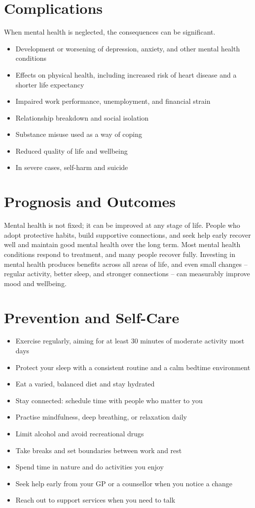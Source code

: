 \section*{Complications}
When mental health is neglected, the consequences can be significant.

\begin{itemize}
    \item Development or worsening of depression, anxiety, and other mental health conditions
    \item Effects on physical health, including increased risk of heart disease and a shorter life expectancy
    \item Impaired work performance, unemployment, and financial strain
    \item Relationship breakdown and social isolation
    \item Substance misuse used as a way of coping
    \item Reduced quality of life and wellbeing
    \item In severe cases, self-harm and suicide
\end{itemize}

\section*{Prognosis and Outcomes}
Mental health is not fixed; it can be improved at any stage of life. People who adopt protective habits, build supportive connections, and seek help early recover well and maintain good mental health over the long term. Most mental health conditions respond to treatment, and many people recover fully. Investing in mental health produces benefits across all areas of life, and even small changes -- regular activity, better sleep, and stronger connections -- can measurably improve mood and wellbeing.

\section*{Prevention and Self-Care}
\begin{itemize}
    \item Exercise regularly, aiming for at least 30 minutes of moderate activity most days
    \item Protect your sleep with a consistent routine and a calm bedtime environment
    \item Eat a varied, balanced diet and stay hydrated
    \item Stay connected: schedule time with people who matter to you
    \item Practise mindfulness, deep breathing, or relaxation daily
    \item Limit alcohol and avoid recreational drugs
    \item Take breaks and set boundaries between work and rest
    \item Spend time in nature and do activities you enjoy
    \item Seek help early from your GP or a counsellor when you notice a change
    \item Reach out to support services when you need to talk
\end{itemize}

